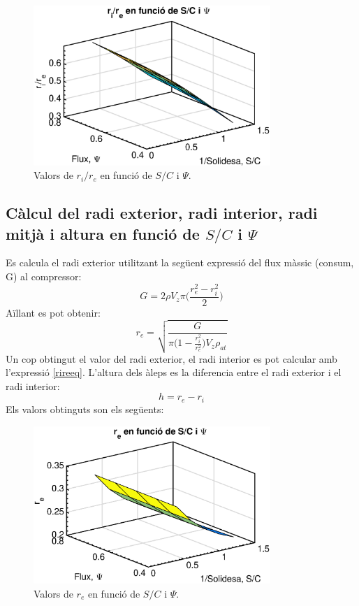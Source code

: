 \begin{figure}[H]
	\centering
	\includegraphics[width=0.8\textwidth]{./code/figures/parametres/rire}
	\caption{Valors de $r_i/r_e$ en funció de $S/C$ i $\Psi$.}
	\label{rire}
\end{figure}

\subsection{Càlcul del radi exterior, radi interior, radi mitjà i altura en funció de $S/C$ i $\Psi$}
Es calcula el radi exterior utilitzant la següent expressió del flux màssic (consum, G) al compressor: 
\begin{equation}
G=2\rho V_z\pi\Big(\frac{r_e^2-r_i^2}{2}\Big)
\end{equation}
Aïllant es pot obtenir: 
\begin{equation}
r_e=\sqrt{\frac{G}{\pi\Big(1-\frac{r_i^2}{r_e^2}\Big)V_z\rho_{at}}}
\end{equation}
Un cop obtingut el valor del radi exterior, el radi interior es pot calcular amb l'expressió \ref{rireeq}. L'altura dels àleps es la diferencia entre el radi exterior i el radi interior: 
\begin{equation}
h=r_e-r_i
\end{equation}
Els valors obtinguts son els següents: 
\begin{figure}[H]
	\centering
	\includegraphics[width=0.8\textwidth]{./code/figures/parametres/re}
	\caption{Valors de $r_e$ en funció de $S/C$ i $\Psi$.}
	\label{re}
\end{figure}


